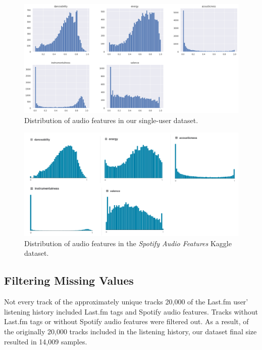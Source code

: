 \documentclass[sn-mathphys]{sn-jnl}%
\theoremstyle{thmstyleone}%
\theoremstyle{thmstyletwo}%
\theoremstyle{thmstylethree}%
\begin{document}
\begin{figure}[h!]
      \centering
      \includegraphics[width=\textwidth]{images/features-distribution.png}
      \caption{Distribution of audio features in our single-user dataset.}
      \label{fig:audio-features-distribution}
\end{figure}

\begin{figure}[h!]
      \centering
      \includegraphics[width=\textwidth]{images/feature-distribution-kaggle.png}
      \caption{Distribution of audio features in the \emph{Spotify Audio Features} Kaggle dataset.}
      \label{fig:audio-features-distribution-kaggle}
\end{figure}

\subsection{Filtering Missing Values}

Not every track of the approximately unique tracks 20,000 of the Last.fm user{'} listening history
included Last.fm tags and Spotify audio features.
Tracks without Last.fm tags or without Spotify audio features were filtered out.
As a result, of the originally 20,000 tracks included in the listening history,
our dataset final size resulted in 14,009 samples.
\end{document}
